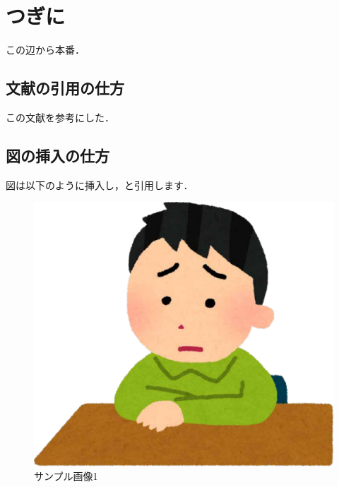 \documentclass[a4paper,11pt,uplatex]{ujreport}
\begin{document}
\chapter{つぎに}
\label{chap:つぎに}

この辺から本番．\par

\section{文献の引用の仕方}
\label{sec:分権の引用の仕方}

この文献\cite{LaTexWiki,渡辺豊2016}を参考にした．\par

\section{図の挿入の仕方}
\label{sec:図の挿入の仕方}

図は以下のように挿入し，と引用します．\par

\begin{figure}[!tb]
  \centering
  \includegraphics[width=\linewidth]{img/sample1.pdf}
  \caption{サンプル画像1}
  \label{fig:sample1}
\end{figure}
\end{document}
